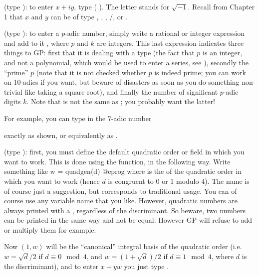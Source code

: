(type ): to enter $x+iy$, type  (
). The letter  stands for $\sqrt{-1}$. Recall from
Chapter 1 that $x$ and $y$ can be of type , ,
, /, or .

\label{se:padic}
(type ): to enter a $p$-adic number, simply write a
rational or integer expression and add to it , where $p$
and $k$ are integers. This last expression indicates three things to GP:
first that it is dealing with a  type (the fact that $p$ is an
integer, and not a polynomial, which would be used to enter a series, see
), secondly the ``prime'' $p$ (note that it is not
checked whether $p$ is indeed prime; you can work on 10-adics if you want, but
beware of disasters as soon as you do something non-trivial like taking a
square root), and finally the number of significant $p$-adic digits $k$.
Note that  is not the same as ; you probably
want the latter!

For example, you can type in the $7$-adic number


\noindent
exactly as shown, or equivalently as
.

(type ): first, you must define the default quadratic order or
field in which you want to work. This is done using the 
function, in the following way. Write something like
\bprog
w = quadgen(d)
@eprog\noindent
where  is the  of the quadratic order in
which you want to work (hence $d$ is congruent to $0$ or $1$ modulo $4$). The
name  is of course just a suggestion, but corresponds to traditional
usage. You can of course use any variable name that you like. However,
quadratic numbers are always printed with a , regardless of the
discriminant. So beware, two numbers can be printed in the same way and not
be equal. However GP will refuse to add or multiply them for example.

Now $(1,w)$ will be the ``canonical'' integral basis of the quadratic order
(i.e.~$w=\sqrt{d}/2$ if $d\equiv 0 \mod 4$, and $w=(1+\sqrt{d})/2$ if
$d\equiv 1 \mod 4$, where $d$ is the discriminant), and to enter $x+yw$ you
just type .

